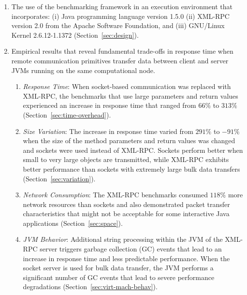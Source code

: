 \documentclass{sig-alternate}
\begin{document}
\begin{enumerate}
\begin{enumerate}
\end{enumerate}

\item The use of the benchmarking framework in an execution
  environment that incorporates: (i) Java programming language version
  1.5.0 (ii) XML-RPC version 2.0 from the Apache Software Foundation,
  and (iii) GNU/Linux Kernel 2.6.12-1.1372 (Section~\ref{sec:design}).

\item Empirical results that reveal fundamental trade-offs in response
  time when remote communication primitives transfer data between
  client and server JVMs running on the same computational node.
 
\begin{enumerate}

\setlength{\itemsep}{0in}
 \setlength{\topsep}{0in}
 \setlength{\partopsep}{0in}

\item {\em Response Time}: When socket-based communication was
  replaced with XML-RPC, the benchmarks that use large parameters and
  return values experienced an increase in response time that ranged
  from $66\%$ to $313\%$ (Section~\ref{sec:time-overhead}).

\item \begin{sloppypar} {\em Size Variation}: The increase in response
  time varied from $291\%$ to $-91\%$ when the size of the method
  parameters and return values was changed and sockets were used
  instead of XML-RPC.  Sockets perform better when small to very large
  objects are transmitted, while XML-RPC exhibits better performance
  than sockets with extremely large bulk data transfers
  (Section~\ref{sec:variation}). \end{sloppypar}

\item \begin{sloppypar} {\em Network Consumption}: The XML-RPC
  benchmarks consumed $118\%$ more network resources than sockets and
  also demonstrated packet transfer characteristics that might not be
  acceptable for some interactive Java applications
  (Section~\ref{sec:space}). \end{sloppypar}

\item \begin{sloppypar} {\em JVM Behavior}: Additional string
  processing within the JVM of the XML-RPC server triggers garbage
  collection (GC) events that lead to an increase in response time and
  less predictable performance.  When the socket server is used for
  bulk data transfer, the JVM performs a significant number of GC
  events that lead to severe performance degradations
  (Section~\ref{sec:virt-mach-behav}). \end{sloppypar}


\end{enumerate}
\end{enumerate}
\end{document}
